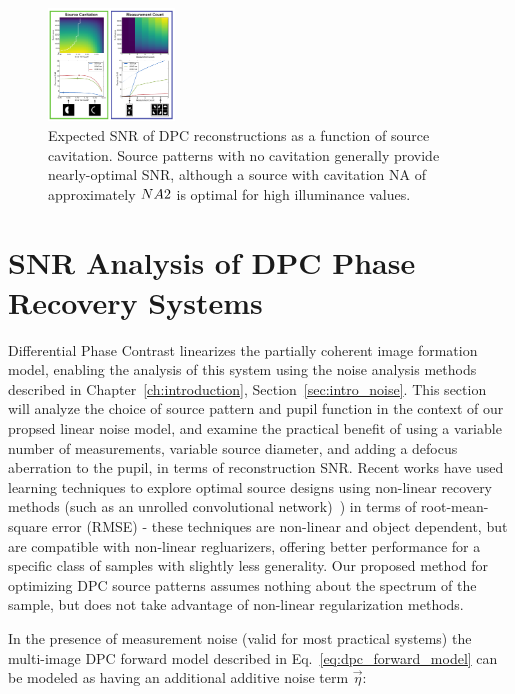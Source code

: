 \begin{figure}
  \label{fig:phase:dpc_cavitation}
  \begin{center}
    \includegraphics[width=0.3\textwidth]{figures/fig_phase_dpc_optimization_cavitation.pdf}
  \end{center}
  \caption{Expected SNR of DPC reconstructions as a function of source cavitation. Source patterns with no cavitation generally provide nearly-optimal SNR, although a source with cavitation NA of approximately $NA \/ 2$ is optimal for high illuminance values.}
\end{figure}

\section{SNR Analysis of DPC Phase Recovery Systems}
Differential Phase Contrast linearizes the partially coherent image formation model, enabling the analysis of this system using the noise analysis methods described in Chapter~\ref{ch:introduction}, Section~\ref{sec:intro_noise}. This section will analyze the choice of source pattern and pupil function in the context of our propsed linear noise model, and examine the practical benefit of using a variable number of measurements, variable source diameter, and adding a defocus aberration to the pupil, in terms of reconstruction SNR. Recent works have used learning techniques to explore optimal source designs using non-linear recovery methods (such as an unrolled convolutional network)~\cite{kellman2019physics}) in terms of root-mean-square error (RMSE) - these techniques are non-linear and object dependent, but are compatible with non-linear regluarizers, offering better performance for a specific class of samples with slightly less generality. Our proposed method for optimizing DPC source patterns assumes nothing about the spectrum of the sample, but does not take advantage of non-linear regularization methods.

In the presence of measurement noise (valid for most practical systems) the multi-image DPC forward model described in Eq.~\ref{eq:dpc_forward_model} can be modeled as having an additional additive noise term $\vec{\eta}$:

